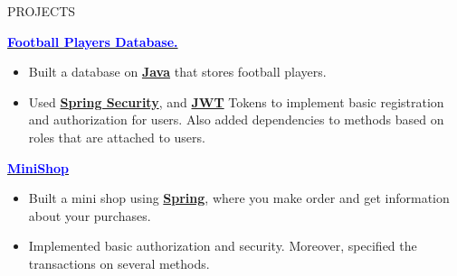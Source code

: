 \documentclass{resume} %
\begin{document}


\begin{rSection}{PROJECTS}
\vspace{-1.25em}

\item \href{https://github.com/turysbekovg/Football-Player-Database}{\textcolor{blue}{\textbf{Football Players Database.}} {\textcolor{black}{\small \faExternalLink}}}
\vspace{-5pt} \item {} \hspace{0cm}  \hspace{0cm}  \hspace{0cm} 
\begin{itemize}
    \itemsep -5pt 
     \item Built a database on \underline {\textbf{Java}} that stores football players. 
     \item Used \underline{\textbf{Spring Security}}, and \underline{\textbf{JWT}} Tokens to implement basic registration and authorization for users. Also added dependencies to methods based on roles that are attached to users.
 \end{itemize}

 \item \href{https://github.com/turysbekovg/MiniShop}{\textcolor{blue}{\textbf{MiniShop}} {\textcolor{black}{\small \faExternalLink}}} 
\vspace{-5pt} \item {} \hspace{0cm}  \hspace{0cm} 
\begin{itemize}
    \itemsep -5pt 
     \item Built a mini shop using \underline {\textbf{Spring}}, where you make order and get information about your purchases. 
     \item Implemented basic authorization and security. Moreover, specified the transactions on several methods.
 \end{itemize}


\end{rSection}
\end{document}
